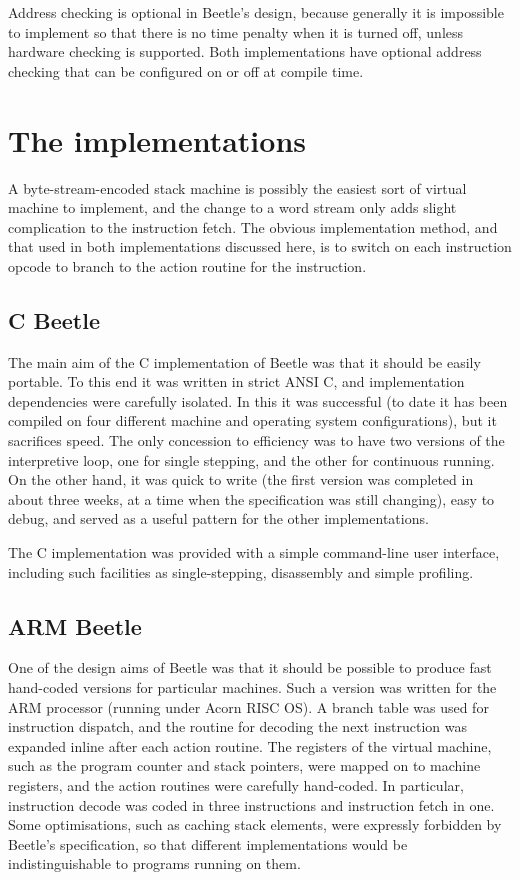 \documentclass{article}
\begin{document}
Address checking is optional in Beetle's design, because generally it is
impossible to implement so that there is no time penalty when it is turned
off, unless hardware checking is supported. Both implementations have
optional address checking that can be configured on or off at compile time.


\section{The implementations}

A byte-stream-encoded stack machine is possibly the easiest sort of virtual
machine to implement, and the change to a word stream only adds slight
complication to the instruction fetch. The obvious implementation method, and
that used in both implementations discussed here, is to switch on each
instruction opcode to branch to the action routine for the instruction.

\subsection{C Beetle}

The main aim of the C implementation of Beetle was that it should be easily
portable. To this end it was written in strict ANSI C, and implementation
dependencies were carefully isolated. In this it was successful (to date it
has been compiled on four different machine and operating system
configurations), but it sacrifices speed. The only concession to efficiency
was to have two versions of the interpretive loop, one for single stepping,
and the other for continuous running. On the other hand, it was quick to
write (the first version was completed in about three weeks, at a time when
the specification was still changing), easy to debug, and served as a useful
pattern for the other implementations.

The C implementation was provided with a simple command-line user interface,
including such facilities as single-stepping, disassembly and simple
profiling.

\subsection{ARM Beetle}

One of the design aims of Beetle was that it should be possible to produce
fast hand-coded versions for particular machines. Such a version was written
for the ARM processor (running under Acorn RISC OS). A branch table was used
for instruction dispatch, and the routine for decoding the next instruction
was expanded inline after each action routine. The registers of the virtual
machine, such as the program counter and stack pointers, were mapped on to
machine registers, and the action routines were carefully hand-coded. In
particular, instruction decode was coded in three instructions and
instruction fetch in one. Some optimisations, such as caching stack elements,
were expressly forbidden by Beetle's specification, so that different
implementations would be indistinguishable to programs running on them.
\end{document}

